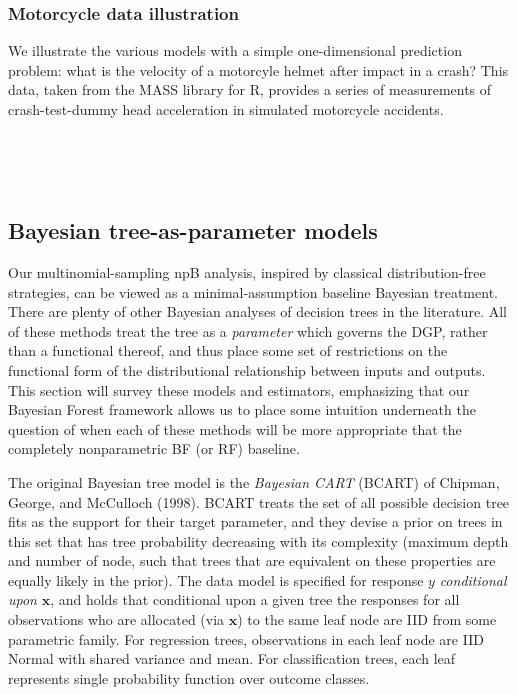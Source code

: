 \documentclass[12pt]{article}
\begin{document}
    \subsubsection{Motorcycle data
illustration}\label{motorcycle-data-illustration}

We illustrate the various models with a simple one-dimensional
prediction problem: what is the velocity of a motorcyle helmet after
impact in a crash? This data, taken from the MASS library for R,
provides a series of measurements of crash-test-dummy head acceleration
in simulated motorcycle accidents.

    \begin{center}
    \end{center}
    { \hspace*{\fill} \\}
    

    \begin{center}
    \end{center}
    { \hspace*{\fill} \\}
    
    \subsection{Bayesian tree-as-parameter
models}\label{bayesian-tree-as-parameter-models}

Our multinomial-sampling npB analysis, inspired by classical
distribution-free strategies, can be viewed as a minimal-assumption
baseline Bayesian treatment. There are plenty of other Bayesian analyses
of decision trees in the literature. All of these methods treat the tree
as a \emph{parameter} which governs the DGP, rather than a functional
thereof, and thus place some set of restrictions on the functional form
of the distributional relationship between inputs and outputs. This
section will survey these models and estimators, emphasizing that our
Bayesian Forest framework allows us to place some intuition underneath
the question of when each of these methods will be more appropriate that
the completely nonparametric BF (or RF) baseline.

The original Bayesian tree model is the \emph{Bayesian CART} (BCART) of
Chipman, George, and McCulloch (1998). BCART treats the set of all
possible decision tree fits as the support for their target parameter,
and they devise a prior on trees in this set that has tree probability
decreasing with its complexity (maximum depth and number of node, such
that trees that are equivalent on these properties are equally likely in
the prior). The data model is specified for response $y$
\emph{conditional upon} $\mathbf{x}$, and holds that conditional upon a
given tree the responses for all observations who are allocated (via
$\mathbf{x}$) to the same leaf node are IID from some parametric family.
For regression trees, observations in each leaf node are IID Normal with
shared variance and mean. For classification trees, each leaf represents
single probability function over outcome classes.
\end{document}

